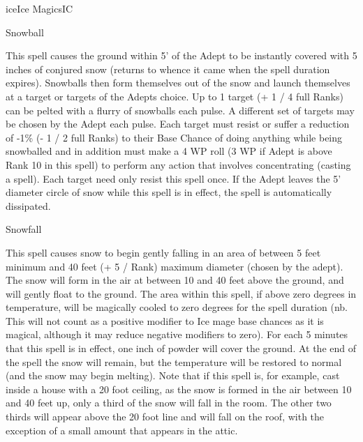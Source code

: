 \begin{college}[1.5]{ice}{Ice Magics}{IC}
\begin{spell}[S-13]{Snowball}

\begin{effects}
This spell causes the ground within 5' of the Adept to be instantly
covered with 5 inches of conjured snow (returns to whence it came when
the spell duration expires).  Snowballs then form themselves out of
the snow and launch themselves at a target or targets of the Adepts
choice. Up to 1 target (+ 1 / 4 full Ranks) can be pelted with a
flurry of snowballs each pulse. A different set of targets may be
chosen by the Adept each pulse.  Each target must resist or suffer a
reduction of -1\% (- 1 / 2 full Ranks) to their Base Chance of doing
anything while being snowballed and in addition must make a 4 \x WP
roll (3 \x WP if Adept is above Rank 10 in this spell) to perform any
action that involves concentrating (\eg casting a spell). Each target
need only resist this spell once. If the Adept leaves the 5' diameter
circle of snow while this spell is in effect, the spell is
automatically dissipated.
\end{effects}
\end{spell}

\begin{spell}[S-14]{Snowfall}

\begin{effects}
This spell causes snow to begin gently falling in an area of between 5
feet minimum and 40 feet (+ 5 / Rank) maximum diameter (chosen by the
adept).  The snow will form in the air at between 10 and 40 feet above
the ground, and will gently float to the ground.  The area within this
spell, if above zero degrees in temperature, will be magically cooled
to zero degrees for the spell duration (nb. This will not count as a
positive modifier to Ice mage base chances as it is magical, although
it may reduce negative modifiers to zero).  For each 5 minutes that
this spell is in effect, one inch of powder will cover the ground.  At
the end of the spell the snow will remain, but the temperature will be
restored to normal (and the snow may begin melting).  Note that if
this spell is, for example, cast inside a house with a 20 foot
ceiling, as the snow is formed in the air between 10 and 40 feet up,
only a third of the snow will fall in the room.  The other two thirds
will appear above the 20 foot line and will fall on the roof, with the
exception of a small amount that appears in the attic.
\end{effects}
\end{spell}


\end{college}
